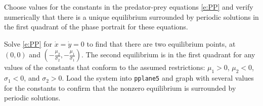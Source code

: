 \documentclass{ximera}
\begin{document}
\begin{computerExercise} \label{c9.1.3}
Choose values for the constants in the predator-prey equations 
\eqref{e:PP} and verify numerically that there is a unique 
equilibrium surrounded by periodic solutions in the first 
quadrant of the phase portrait for these equations.

\begin{solution}

Solve \eqref{e:PP} for $\dot{x} = \dot{y} = 0$ to find that there are
two equilibrium points, at $(0,0)$ and $(-\frac{\mu_2}{\sigma_2},
-\frac{\mu_1}{\sigma_1})$.  The second equilibrium is in the first
quadrant for any values of the constants that conform to the assumed
restrictions: $\mu_1 > 0$, $\mu_2 < 0$, $\sigma_1 < 0$, and
$\sigma_2 > 0$.  Load the system into {\tt pplane5} and graph with
several values for the constants to confirm that the nonzero
equilibrium is surrounded by periodic solutions.

\end{solution}
\end{computerExercise}
\end{document}
